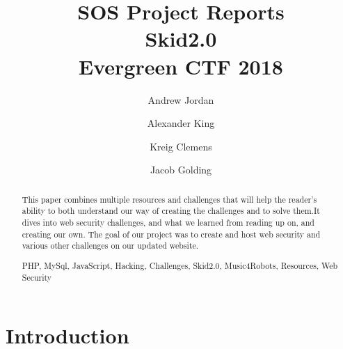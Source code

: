 \documentclass[runningheads,a4paper]{llncs}
\newcommand{\keywords}[1]{\par\addvspace\baselineskip
\noindent\keywordname\enspace\ignorespaces#1}
\begin{document}
\mainmatter  %

\title{SOS Project Reports\\ Skid2.0\\ Evergreen CTF 2018}


%
%
\author{Andrew Jordan \and Alexander King \and Kreig Clemens \and Jacob Golding }
%


%
%

\maketitle


\begin{abstract}
This paper combines multiple resources and challenges that will help the reader’s ability to both understand our way of creating the challenges and to solve them.It dives into web security challenges, and what we learned from reading up on, and creating our own. The goal of our project was to create and host web security and various other challenges on our updated website.
\keywords{PHP, MySql, JavaScript, Hacking, Challenges, Skid2.0, Music4Robots, Resources, Web Security}
\end{abstract}


\section{Introduction}
\end{document}
